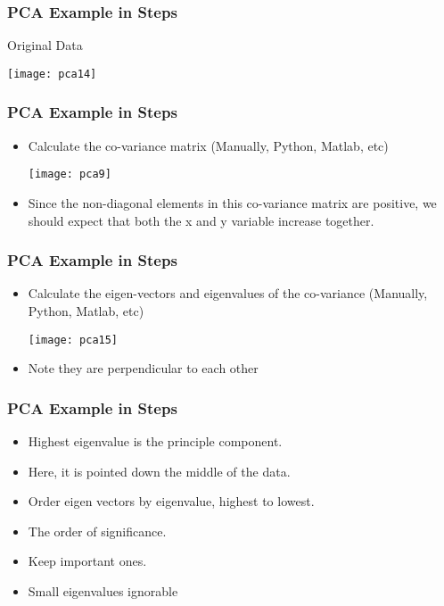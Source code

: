 \begin{frame}[fragile] \frametitle{PCA Example in Steps} 
Original Data
\begin{center}
\texttt{[image: pca14]}
\end{center}
\end{frame}


\begin{frame}[fragile] \frametitle{PCA Example in Steps} 
\begin{itemize}
\item Calculate the co-variance matrix (Manually, Python, Matlab, etc)
\begin{center}
\texttt{[image: pca9]}
\end{center}
\item Since the non-diagonal elements in this co-variance 
matrix are positive, we should expect that both the x 
and y variable increase together.
\end{itemize}
\end{frame}

\begin{frame}[fragile] \frametitle{PCA Example in Steps} 
\begin{itemize}
\item Calculate the eigen-vectors and eigenvalues of the co-variance  (Manually, Python, Matlab, etc)
\begin{center}
\texttt{[image: pca15]}
\end{center}
\item Note they are perpendicular to each other
\end{itemize}
\end{frame}

\begin{frame}[fragile] \frametitle{PCA Example in Steps} 
\begin{itemize}
\item Highest eigenvalue is the principle component.
\item Here, it is pointed down the middle of the data. 
\item Order eigen vectors by eigenvalue, highest to lowest. 
\item The order of significance. 
\item Keep important ones. 
\item Small eigenvalues ignorable
\end{itemize}
\end{frame}

